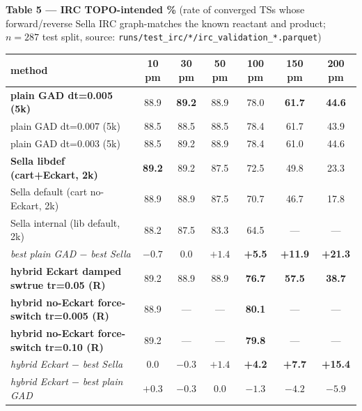 \documentclass[11pt]{article}
\begin{document}
\begin{center}\footnotesize
\textbf{Table 5 --- IRC TOPO-intended \%} (rate of converged TSs whose
forward/reverse Sella IRC graph-matches the known reactant and product;
$n=287$ test split, source: \texttt{runs/test\_irc/*/irc\_validation\_*.parquet})
\\[0.4em]
\begin{tabular}{l|cccccc}
\toprule
\textbf{method} & 10 pm & 30 pm & 50 pm & 100 pm & 150 pm & 200 pm \\
\midrule
\textbf{plain GAD dt=0.005 (5k)}        & 88.9 & \textbf{89.2} & 88.9 & 78.0 & \textbf{61.7} & \textbf{44.6} \\
plain GAD dt=0.007 (5k)                 & 88.5 & 88.5 & 88.5 & 78.4 & 61.7 & 43.9 \\
plain GAD dt=0.003 (5k)                 & 88.5 & 89.2 & 88.9 & 78.4 & 61.0 & 44.6 \\
\midrule
\textbf{Sella libdef (cart+Eckart, 2k)} & \textbf{89.2} & 89.2 & 87.5 & 72.5 & 49.8 & 23.3 \\
Sella default (cart no-Eckart, 2k)      & 88.9 & 88.9 & 87.5 & 70.7 & 46.7 & 17.8 \\
Sella internal (lib default, 2k)        & 88.2 & 87.5 & 83.3 & 64.5 & ---  & ---  \\
\midrule
\textit{best plain GAD $-$ best Sella}  & $-0.7$ & $0.0$ & $+1.4$ & \textbf{+5.5} & \textbf{+11.9} & \textbf{+21.3} \\
\midrule
\textbf{hybrid Eckart damped swtrue tr=0.05 \textbf{(R)}} & 89.2 & 88.9 & 88.9 & \textbf{76.7} & \textbf{57.5} & \textbf{38.7} \\
\textbf{hybrid no-Eckart force-switch tr=0.005 \textbf{(R)}} & 88.9 & --- & --- & \textbf{80.1} & --- & --- \\
\textbf{hybrid no-Eckart force-switch tr=0.10 \textbf{(R)}} & 89.2 & --- & --- & \textbf{79.8} & --- & --- \\
\midrule
\textit{hybrid Eckart $-$ best Sella}    & $0.0$ & $-0.3$ & $+1.4$ & \textbf{+4.2} & \textbf{+7.7} & \textbf{+15.4} \\
\textit{hybrid Eckart $-$ best plain GAD}& $+0.3$ & $-0.3$ & $0.0$ & $-1.3$ & $-4.2$ & $-5.9$ \\
\bottomrule
\end{tabular}
\end{center}
\end{document}
